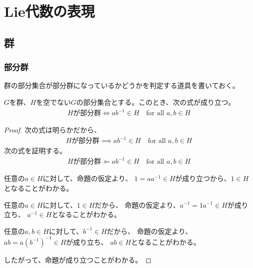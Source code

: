 	{\setlength\arraycolsep{2pt}
\section{Lie代数の表現}\label{s1:Lie代数の表現} %
\subsection{群}\label{s2:群} %
\subsubsection{部分群}\label{s3:部分群} %
	群の部分集合が部分群になっているかどうかを判定する道具を書いておく。

	\begin{proposition}[部分群]\label{prop:部分群} %
		$G$を群、$H$を空でない$G$の部分集合とする。このとき、次の式が成り立つ。
		\begin{equation*}\begin{split}
			\text{$H$が部分群}
			\iff ab^{-1}\in H \quad\text{for all } a,b\in H
		\end{split}\end{equation*}
	\end{proposition} %
	\begin{proof} %
		次の式は明らかだから、
		\begin{equation*}\begin{split}
			\text{$H$が部分群}
			\implies ab^{-1}\in H \quad\text{for all } a,b\in H
		\end{split}\end{equation*}
		次の式を証明する。
		\begin{equation*}\begin{split}
			\text{$H$が部分群}
			\Leftarrow ab^{-1}\in H \quad\text{for all } a,b\in H
		\end{split}\end{equation*}
		\begin{description}\setlength{\itemsep}{-1mm} %
			\item[単位元] 任意の$a\in H$に対して、命題の仮定より、
			$1=aa^{-1}\in H$が成り立つから、$1\in H$となることがわかる。
			\item[逆元] 任意の$a\in H$に対して、$1\in H$だから、
			命題の仮定より、$a^{-1}=1a^{-1}\in H$が成り立ち、
			$a^{-1}\in H$となることがわかる。
			\item[積] 任意の$a,b\in H$に対して、$b^{-1}\in H$だから、
			命題の仮定より、$ab=a(b^{-1})^{-1}\in H$が成り立ち、
			$ab\in H$となることがわかる。
		\end{description} %
		したがって、命題が成り立つことがわかる。
	\end{proof} %

}
